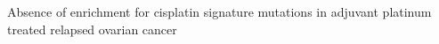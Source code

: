 Absence of enrichment for cisplatin signature mutations in adjuvant platinum treated relapsed ovarian cancer